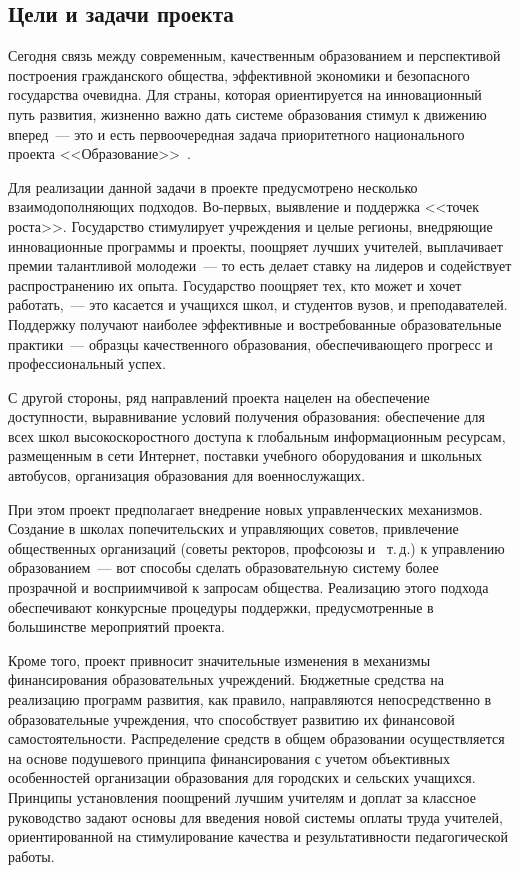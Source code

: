 \documentclass[article, 12pt, russian, oneside]{ncc}
\begin{document}
\subsection{Цели и задачи проекта}

Сегодня связь между современным, качественным образованием и
перспективой построения гражданского общества, эффективной экономики и
безопасного государства очевидна. Для страны, которая ориентируется на
инновационный путь развития, жизненно важно дать системе образования
стимул к движению вперед~--- это и есть первоочередная задача
приоритетного национального проекта
<<Образование>>~\cite{Edu_Problems}.

Для реализации данной задачи в проекте предусмотрено несколько
взаимодополняющих подходов. Во-первых, выявление и поддержка <<точек
роста>>. Государство стимулирует учреждения и целые регионы,
внедряющие инновационные программы и проекты, поощряет лучших
учителей, выплачивает премии талантливой молодежи~--- то есть делает
ставку на лидеров и содействует распространению их опыта. Государство
поощряет тех, кто может и хочет работать,~--- это касается и учащихся
школ, и студентов вузов, и преподавателей. Поддержку получают наиболее
эффективные и востребованные образовательные практики~--- образцы
качественного образования, обеспечивающего прогресс и профессиональный
успех.

С другой стороны, ряд направлений проекта нацелен на обеспечение
доступности, выравнивание условий получения образования: обеспечение
для всех школ высокоскоростного доступа к глобальным информационным
ресурсам, размещенным в сети Интернет, поставки учебного оборудования
и школьных автобусов, организация образования для военнослужащих.

При этом проект предполагает внедрение новых управленческих
механизмов. Создание в школах попечительских и управляющих советов,
привлечение общественных организаций (советы ректоров, профсоюзы и~
т.\,д.) к управлению образованием~--- вот способы сделать
образовательную систему более прозрачной и восприимчивой к запросам
общества. Реализацию этого подхода обеспечивают конкурсные процедуры
поддержки, предусмотренные в большинстве мероприятий проекта.

Кроме того, проект привносит значительные изменения в механизмы
финансирования образовательных учреждений. Бюджетные средства на
реализацию программ развития, как правило, направляются
непосредственно в образовательные учреждения, что способствует
развитию их финансовой самостоятельности. Распределение средств в
общем образовании осуществляется на основе подушевого принципа
финансирования с учетом объективных особенностей организации
образования для городских и сельских учащихся. Принципы установления
поощрений лучшим учителям и доплат за классное руководство задают
основы для введения новой системы оплаты труда учителей,
ориентированной на стимулирование качества и результативности
педагогической работы.
\end{document}
